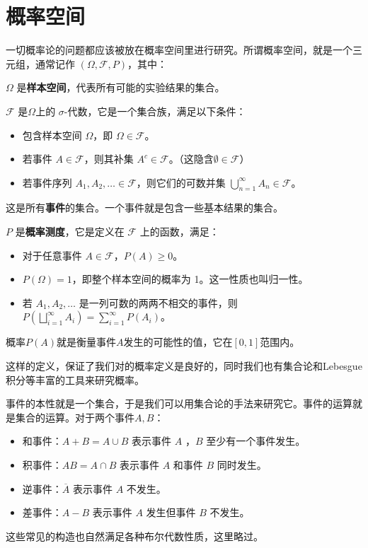 \section{概率空间}

一切概率论的问题都应该被放在概率空间里进行研究。所谓概率空间，就是一个三元组，通常记作 $(\Omega, \mathcal{F}, P)$，其中：

$\Omega$ 是\textbf{样本空间}，代表所有可能的实验结果的集合。

$\mathcal{F}$ 是$\Omega$上的 $\sigma$-代数，它是一个集合族，满足以下条件：
\begin{itemize}
    \item 包含样本空间 $\Omega$，即 $\Omega \in \mathcal{F}$。
    \item 若事件 $A \in \mathcal{F}$，则其补集 $A^c \in \mathcal{F}$。（这隐含$\emptyset \in \mathcal{F}$）
    \item 若事件序列 $A_1, A_2, \ldots \in \mathcal{F}$，则它们的可数并集 $\bigcup_{n=1}^{\infty} A_n \in \mathcal{F}$。
\end{itemize}
这是所有\textbf{事件}的集合。一个事件就是包含一些基本结果的集合。

$P$ 是\textbf{概率测度}，它是定义在 $\mathcal{F}$ 上的函数，满足：

\begin{itemize}
    \item 对于任意事件 $A \in \mathcal{F}$，$P(A) \geq 0$。
    \item $P(\Omega) = 1$，即整个样本空间的概率为 1。这一性质也叫归一性。
    \item 若 $A_1, A_2, \ldots$ 是一列可数的两两不相交的事件，则 $P\left(\bigsqcup_{i=1}^{\infty} A_i\right) = \sum_{i=1}^{\infty} P(A_i)$。
\end{itemize}
概率$P(A)$就是衡量事件$A$发生的可能性的值，它在$[0,1]$范围内。

这样的定义，保证了我们对的概率定义是良好的，同时我们也有集合论和Lebesgue积分等丰富的工具来研究概率。

事件的本性就是一个集合，于是我们可以用集合论的手法来研究它。事件的运算就是集合的运算。对于两个事件$A,B$：
\begin{itemize}
    \item 和事件：$A+B=A \cup B$ 表示事件 $A$ ，$B$ 至少有一个事件发生。
    \item 积事件：$AB=A \cap B$ 表示事件 $A$ 和事件 $B$ 同时发生。
    \item 逆事件：$\overline{A}$ 表示事件 $A$ 不发生。
    \item 差事件：$A - B$ 表示事件 $A$ 发生但事件 $B$ 不发生。
\end{itemize}
这些常见的构造也自然满足各种布尔代数性质，这里略过。

